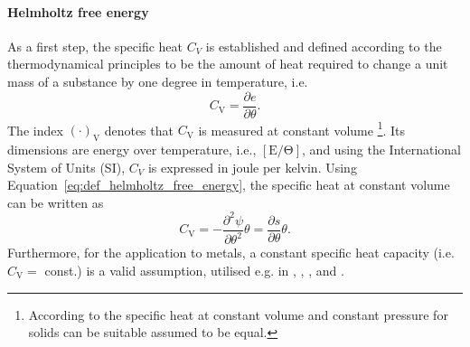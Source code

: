 \paragraph{Helmholtz free energy}
As a first step, the specific heat \(C_{V}\) is established and defined according to the thermodynamical principles to be the amount of heat required to change a unit mass of a substance by one degree in temperature, i.e.
\begin{equation}
C_{\mathrm{V}}=\frac{\partial e}{\partial \theta}.
\end{equation}
The index \((\cdot)_\mathrm{V}\) denotes that \(C_\mathrm{V}\) is measured at constant volume \footnote{According to \cite{cengel_thermodynamics_2011} the specific heat at constant volume and constant pressure for solids can be suitable assumed to be equal.}.
Its dimensions are energy over temperature, i.e., \(\mathrm{[E/\Theta]}\), and using the International System of Units (SI), \(C_{V}\) is expressed in joule per kelvin.
Using Equation~\ref{eq:def_helmholtz_free_energy}, the specific heat at constant volume can be written as
\begin{equation} \label{eq:def_cv_partial}
C_{\mathrm{V}}=-\frac{\partial^{2} \psi}{\partial \theta^{2}} \theta=\frac{\partial s}{\partial \theta} \theta.
\end{equation}
Furthermore, for the application to metals, a constant specific heat capacity (i.e. \(C_{\mathrm{V}}=\) const.) is a valid assumption, utilised e.g. in \cite{adam_thermomechanical_2005}, \cite{ghadiani2005multiphasic}, \cite{ibrahimbegovic_covariant_2002}, and \cite{simo_associative_1992}.
